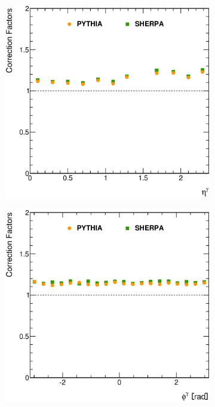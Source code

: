 \documentclass[12pt, twoside]{article}
\numberwithin{equation}{section}
\numberwithin{figure}{section}
\newenvironment{changemargin}[2]{%
\begin{list}{}{%
\setlength{\topsep}{0pt}%
\setlength{\leftmargin}{#1}%
\setlength{\rightmargin}{#2}%
\setlength{\listparindent}{\parindent}%
\setlength{\itemindent}{\parindent}%
\setlength{\parsep}{\parskip}%
}%
\item[]}{\end{list}}
\begin{document}
\begin{figure}
\begin{changemargin}{-1.0cm}{-0.75cm}
\begin{changemargin}{-0.75cm}{-1.0cm}
\begin{subfigure}[b]{0.37\textwidth}
            \includegraphics[width=\textwidth]{./images/CorrectionFactors/CORR_FACT-102.eps}
            \subcaption{}
            \label{fig:CorrectionFactorEtaPhoton}
        \end{subfigure}
        \begin{subfigure}[b]{0.37\textwidth}
            \includegraphics[width=\textwidth]{./images/CorrectionFactors/CORR_FACT-103.eps}
            \subcaption{}
            \label{fig:CorrectionFactorPhiPhoton}
        \end{subfigure}


\end{changemargin}
\end{changemargin}
\end{figure}
\end{document}
